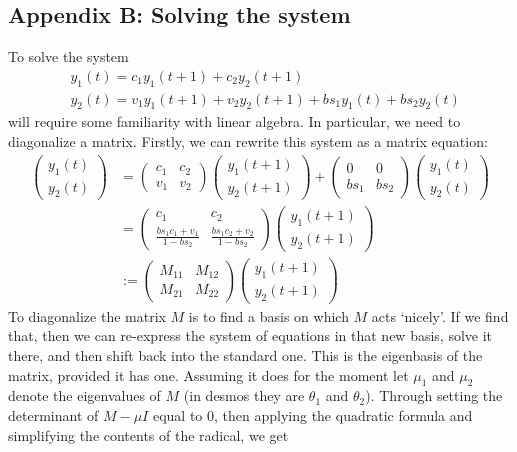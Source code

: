 \documentclass{article}
\theoremstyle{theorem}
\begin{document}
\subsection{Appendix B: Solving the system}
	To solve the system 
\begin{align}
	& y_1(t) = c_1y_1(t+1) + c_2y_2(t+1) \label{sys1} \\
	& y_2(t) = v_1y_1(t+1) + v_2y_2(t+1) + bs_1y_1(t) + bs_2y_2(t) \label{sys2}
\end{align}
will require some familiarity with linear algebra. In particular, we need to diagonalize a matrix. Firstly, we can rewrite this system as a matrix equation:
\begin{align}
	\begin{pmatrix} y_1(t) \\ y_2(t) \end{pmatrix} &= \begin{pmatrix} c_1 & c_2 \\ v_1 & v_2 \end{pmatrix} \begin{pmatrix} y_1(t+1) \\ y_2(t+1) \end{pmatrix} + \begin{pmatrix} 0 & 0 \\ bs_1 & bs_2 \end{pmatrix} \begin{pmatrix} y_1(t) \\ y_2(t) \end{pmatrix} \\
	&= \begin{pmatrix} c_1 & c_2 \\ \frac{bs_1c_1 + v_1}{1-bs_2} & \frac{bs_1c_2 + v_2}{1-bs_2} \end{pmatrix}\begin{pmatrix} y_1(t+1) \\ y_2(t+1) \end{pmatrix} \\
	&:= \begin{pmatrix} M_{11} & M_{12} \\ M_{21} & M_{22} \end{pmatrix}\begin{pmatrix} y_1(t+1) \\ y_2(t+1) \end{pmatrix}
\end{align}
To diagonalize the matrix $M$ is to find a basis on which $M$ acts `nicely'. If we find that, then we can re-express the system of equations in that new basis, solve it there, and then shift back into the standard one. This is the eigenbasis of the matrix, provided it has one. Assuming it does for the moment let $\mu_1$ and $\mu_2$ denote the eigenvalues of $M$ (in desmos they are $\theta_1$ and $\theta_2$). Through setting the determinant of $M-\mu I$ equal to 0, then applying the quadratic formula and simplifying the contents of the radical, we get
\end{document}
